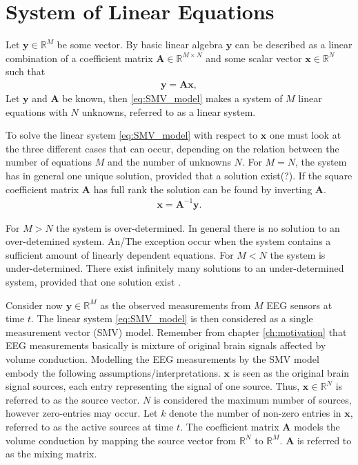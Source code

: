 \section{System of Linear Equations}\label{sec:SMV}
Let $\mathbf{y} \in \mathbb{R}^M$ be some vector. By basic linear algebra $\mathbf{y}$ can be described as a linear combination of a coefficient matrix $\mathbf{A} \in \mathbb{R}^{M \times N}$ and some scalar vector $\mathbf{x} \in \mathbb{R}^N$ such that
\begin{align}\label{eq:SMV_model}
\mathbf{y} = \mathbf{Ax},
\end{align}
Let $\mathbf{y}$ and $\mathbf{A}$ be known, then  
\ref{eq:SMV_model} makes a system of $M$ linear equations with $N$ unknowns, referred to as a linear system. 

To solve the linear system \ref{eq:SMV_model} with respect to $\textbf{x}$ one must look at the three different cases that can occur, depending on the relation between the number of equations $M$ and the number of unknowns $N$.
For $M = N$, the system has in general one unique solution, provided that a solution exist(?).  
If the square coefficient matrix $\mathbf{A}$ has full rank the solution can be found by inverting $\mathbf{A}$.
\begin{align*}
\mathbf{x} = \mathbf{A}^{-1} \mathbf{y}.
\end{align*}

For $M > N$ the system is over-determined. In general there is no solution to an over-detemined system. An/The exception occur when the system contains a sufficient amount of linearly dependent equations.    
For $M < N$ the system is under-determined. There exist infinitely many solutions to an under-determined system, provided that one solution exist \cite[p. ix]{CS}.  

Consider now $\mathbf{y} \in \mathbb{R}^M$ as the observed measurements from $M$ EEG sensors at time $t$. 
The linear system \ref{eq:SMV_model} is then considered as a single measurement vector (SMV) model.
Remember from chapter \ref{ch:motivation} that EEG measurements basically is mixture of original brain signals affected by volume conduction.  
Modelling the EEG measurements by the SMV model embody the following assumptions/interpretations. $\textbf{x}$ is seen as the original brain signal sources, each entry representing the signal of one source. 
Thus, $\textbf{x}\in \mathbb{R}^N$ is referred to as the source vector. $N$ is considered the maximum number of sources, however zero-entries may occur. Let $k$ denote the number of non-zero entries in $\textbf{x}$, referred to as the active sources at time $t$.   
The coefficient matrix $\textbf{A}$ models the volume conduction by mapping the source vector from $\mathbb{R}^N$ to $\mathbb{R}^M$. $\textbf{A}$ is referred to as the mixing matrix.             

